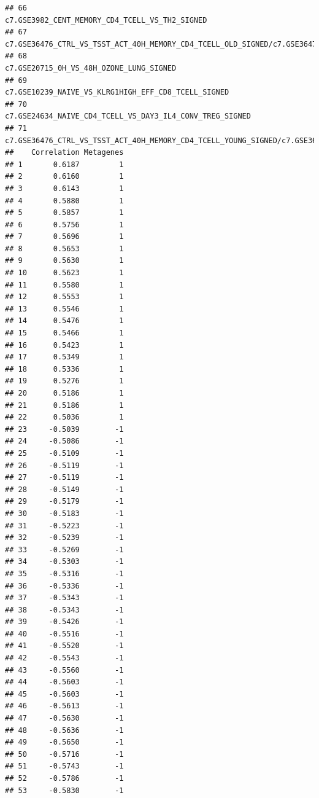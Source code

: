 \documentclass{article}\usepackage[]{graphicx}\usepackage[]{color}
\makeatletter
\newenvironment{kframe}{%
 \def\at@end@of@kframe{}%
 \ifinner\ifhmode%
  \def\at@end@of@kframe{\end{minipage}}%
  \begin{minipage}{\columnwidth}%
 \fi\fi%
 \def\FrameCommand##1{\hskip\@totalleftmargin \hskip-\fboxsep
 \colorbox{shadecolor}{##1}\hskip-\fboxsep
     \hskip-\linewidth \hskip-\@totalleftmargin \hskip\columnwidth}%
 \MakeFramed {\advance\hsize-\width
   \@totalleftmargin\z@ \linewidth\hsize
   \@setminipage}}%
 {\par\unskip\endMakeFramed%
 \at@end@of@kframe}
\newenvironment{knitrout}{}{} %
\makeatother
\begin{document}
\begin{knitrout}
\begin{kframe}
\begin{verbatim}
## 66                                                                                                                                     c7.GSE3982_CENT_MEMORY_CD4_TCELL_VS_TH2_SIGNED
## 67                                                          c7.GSE36476_CTRL_VS_TSST_ACT_40H_MEMORY_CD4_TCELL_OLD_SIGNED/c7.GSE36476_CTRL_VS_TSST_ACT_72H_MEMORY_CD4_TCELL_OLD_SIGNED
## 68                                                                                                                                            c7.GSE20715_0H_VS_48H_OZONE_LUNG_SIGNED
## 69                                                                                                                                c7.GSE10239_NAIVE_VS_KLRG1HIGH_EFF_CD8_TCELL_SIGNED
## 70                                                                                                                           c7.GSE24634_NAIVE_CD4_TCELL_VS_DAY3_IL4_CONV_TREG_SIGNED
## 71                                                      c7.GSE36476_CTRL_VS_TSST_ACT_40H_MEMORY_CD4_TCELL_YOUNG_SIGNED/c7.GSE36476_CTRL_VS_TSST_ACT_72H_MEMORY_CD4_TCELL_YOUNG_SIGNED
##    Correlation Metagenes
## 1       0.6187         1
## 2       0.6160         1
## 3       0.6143         1
## 4       0.5880         1
## 5       0.5857         1
## 6       0.5756         1
## 7       0.5696         1
## 8       0.5653         1
## 9       0.5630         1
## 10      0.5623         1
## 11      0.5580         1
## 12      0.5553         1
## 13      0.5546         1
## 14      0.5476         1
## 15      0.5466         1
## 16      0.5423         1
## 17      0.5349         1
## 18      0.5336         1
## 19      0.5276         1
## 20      0.5186         1
## 21      0.5186         1
## 22      0.5036         1
## 23     -0.5039        -1
## 24     -0.5086        -1
## 25     -0.5109        -1
## 26     -0.5119        -1
## 27     -0.5119        -1
## 28     -0.5149        -1
## 29     -0.5179        -1
## 30     -0.5183        -1
## 31     -0.5223        -1
## 32     -0.5239        -1
## 33     -0.5269        -1
## 34     -0.5303        -1
## 35     -0.5316        -1
## 36     -0.5336        -1
## 37     -0.5343        -1
## 38     -0.5343        -1
## 39     -0.5426        -1
## 40     -0.5516        -1
## 41     -0.5520        -1
## 42     -0.5543        -1
## 43     -0.5560        -1
## 44     -0.5603        -1
## 45     -0.5603        -1
## 46     -0.5613        -1
## 47     -0.5630        -1
## 48     -0.5636        -1
## 49     -0.5650        -1
## 50     -0.5716        -1
## 51     -0.5743        -1
## 52     -0.5786        -1
## 53     -0.5830        -1

\end{verbatim}
\end{kframe}
\end{knitrout}
\end{document}

